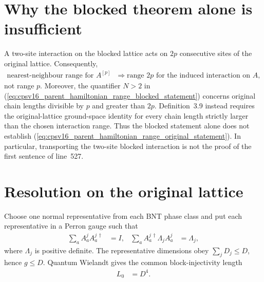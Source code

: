 \documentclass{article}
\begin{document}
\section{Why the blocked theorem alone is insufficient}

A two-site interaction on the blocked lattice acts on $2p$ consecutive sites
of the original lattice. Consequently,
\begin{align}
    \text{nearest-neighbour range for }A^{[p]}
      &\Longrightarrow \text{range }2p\text{ for the induced interaction on }A,
    \label{eq:cpsv16_parent_hamiltonian_range_naive_transport}
\end{align}
not range $p$. Moreover, the quantifier $N>2$ in
(\ref{eq:cpsv16_parent_hamiltonian_range_blocked_statement}) concerns original
chain lengths divisible by $p$ and greater than $2p$. Definition~3.9 instead
requires the original-lattice ground-space identity for every chain length
strictly larger than the chosen interaction range. Thus the blocked statement
alone does not establish
(\ref{eq:cpsv16_parent_hamiltonian_range_original_statement}). In
particular, transporting the two-site blocked interaction is not the proof of
the first sentence of line~527.

\section{Resolution on the original lattice}

Choose one normal representative from each BNT phase class and put each
representative in a Perron gauge such that
\begin{align}
    \sum_a A^j_a A^{j\,\dagger}_a          &=I,
    &
    \sum_a A^{j\,\dagger}_a\Lambda_j A^j_a&=\Lambda_j,
    \label{eq:cpsv16_parent_hamiltonian_range_perron_gauge}
\end{align}
where $\Lambda_j$ is positive definite. The representative dimensions obey
$\sum_jD_j\leq D$, hence $g\leq D$. Quantum Wielandt gives the common
block-injectivity length
\begin{align}
    L_0&=D^4.
    \label{eq:cpsv16_parent_hamiltonian_range_wielandt_length}
\end{align}
\end{document}
